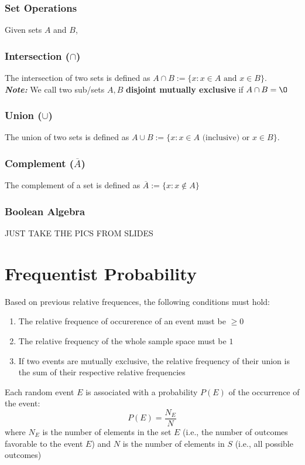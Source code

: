 \documentclass[13pt]{article}
\begin{document}
\subsubsection{Set Operations}
Given sets $A$ and $B$,

\subsubsection*{Intersection ($\cap$)} The intersection of two sets is
defined as $A \cap B := \{x : x \in A \text{ and } x \in B\}$. \\
\textit{\textbf{Note:}} We call two sub/sets $A, B$ \textbf{disjoint
  mutually exclusive} if $A \cap B = \O$

\subsubsection*{Union ($\cup$)} The union of two sets is
defined as $A \cup B := \{x : x \in A \text{ (inclusive) or } x \in B\}$.

\subsubsection*{Complement ($\overline{A}$)} The complement of a set is
defined as $\overline{A} := \{x : x \not\in A\}$

\subsubsection*{Boolean Algebra}
JUST TAKE THE PICS FROM SLIDES


\section{Frequentist Probability}
Based on previous relative frequences, the following conditions must
hold:
\begin{enumerate}[label=(\roman*)]
\item The relative frequence of occurerence of an event must be $\geq
  0$
\item The relative frequency of the whole sample space must be $1$
\item If two events are mutually exclusive, the relative frequency of
  their union is the sum of their respective relative frequencies
\end{enumerate}
Each random event $E$ is associated with a probability $P(E)$ of the
occurrence of the event:
\[P(E) = \frac{N_{E}}{N}\]
where $N_{E}$ is the number of elements in the set $E$ (i.e., the
number of outcomes favorable to the event $E$) and $N$ is the number
of elements in $S$ (i.e., all possible outcomes)
\end{document}
